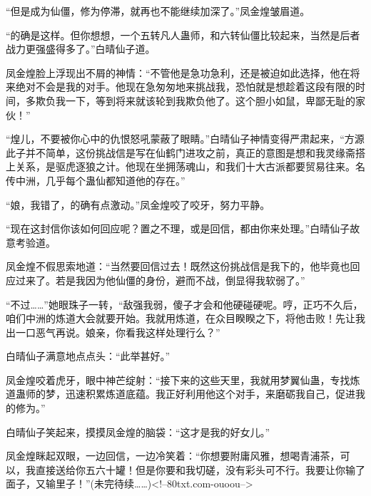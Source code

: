 \begin{this_body}
“但是成为仙僵，修为停滞，就再也不能继续加深了。”凤金煌皱眉道。

“的确是这样。但你想想，一个五转凡人蛊师，和六转仙僵比较起来，当然是后者战力更强盛得多了。”白晴仙子道。

凤金煌脸上浮现出不屑的神情：“不管他是急功急利，还是被迫如此选择，他在将来绝对不会是我的对手。他现在急匆匆地来挑战我，恐怕就是想趁着这段有限的时间，多欺负我一下，等到将来就该轮到我欺负他了。这个胆小如鼠，卑鄙无耻的家伙！”

“煌儿，不要被你心中的仇恨怒吼蒙蔽了眼睛。”白晴仙子神情变得严肃起来，“方源此子并不简单，这份挑战信是写在仙鹤门进攻之前，真正的意图是想和我灵缘斋搭上关系，是驱虎逐狼之计。他现在坐拥荡魂山，和我们十大古派都要贸易往来。名传中洲，几乎每个蛊仙都知道他的存在。”

“娘，我错了，的确有点激动。”凤金煌咬了咬牙，努力平静。

“现在这封信你该如何回应呢？置之不理，或是回信，都由你来处理。”白晴仙子故意考验道。

凤金煌不假思索地道：“当然要回信过去！既然这份挑战信是我下的，他毕竟也回应过来了。若是我因为他仙僵的身份，避而不战，倒显得我软弱了。”

“不过……”她眼珠子一转，“敌强我弱，傻子才会和他硬碰硬呢。哼，正巧不久后，咱们中洲的炼道大会就要开始。我就用炼道，在众目睽睽之下，将他击败！先让我出一口恶气再说。娘亲，你看我这样处理行么？”

白晴仙子满意地点点头：“此举甚好。”

凤金煌咬着虎牙，眼中神芒绽射：“接下来的这些天里，我就用梦翼仙蛊，专找炼道蛊师的梦，迅速积累炼道底蕴。我正好利用他这个对手，来磨砺我自己，促进我的修为。”

白晴仙子笑起来，摸摸凤金煌的脑袋：“这才是我的好女儿。”

凤金煌眯起双眼，一边回信，一边冷笑着：“你想要附庸风雅，想喝青浦茶，可以，我直接送给你五六十罐！但是你要和我切磋，没有彩头可不行。我要让你输了面子，又输里子！”(未完待续……)<!--80txt.com-ouoou-->

\end{this_body}


